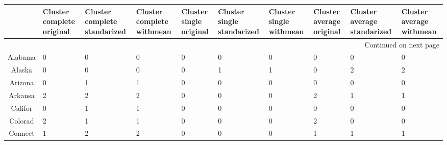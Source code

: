 \begin{longtable}{cp{1.5cm}p{1.5cm}p{1.5cm}p{1.5cm}p{1.5cm}p{1.5cm}p{1.5cm}p{1.5cm}p{1.5cm}}
\toprule
{} &  Cluster complete original &  Cluster complete standarized &  Cluster complete withmean &  Cluster single original &  Cluster single standarized &  Cluster single withmean &  Cluster average original &  Cluster average standarized &  Cluster average withmean \\
\midrule
\endhead
\midrule
\multicolumn{10}{r}{{Continued on next page}} \\
\midrule
\endfoot

\bottomrule
\endlastfoot
Alabama &                          0 &                             0 &                          0 &                        0 &                           0 &                        0 &                         0 &                            0 &                         0 \\
Alaska  &                          0 &                             0 &                          0 &                        0 &                           1 &                        1 &                         0 &                            2 &                         2 \\
Arizona &                          0 &                             1 &                          1 &                        0 &                           0 &                        0 &                         0 &                            0 &                         0 \\
Arkansa &                          2 &                             2 &                          2 &                        0 &                           0 &                        0 &                         2 &                            1 &                         1 \\
Califor &                          0 &                             1 &                          1 &                        0 &                           0 &                        0 &                         0 &                            0 &                         0 \\
Colorad &                          2 &                             1 &                          1 &                        0 &                           0 &                        0 &                         2 &                            0 &                         0 \\
Connect &                          1 &                             2 &                          2 &                        0 &                           0 &                        0 &                         1 &                            1 &                         1 \\

\end{longtable}
